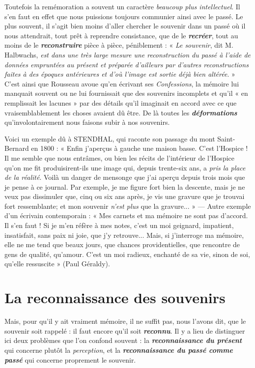 Toutefois la remémoration a souvent un caractère {\it beaucoup plus
intellectuel}. Il s’en faut en effet que nous puissions toujours communier
ainsi avec le passé. Le plus souvent, il s’agit bien moins d’aller
chercher le souvenir dans un passé où il nous attendrait, tout prêt
à reprendre consistance, que de le \textbf{\textit {recréer}}, tout au moins de le \textbf{\textit {reconstruire}}
pièce à pièce, péniblement : « {\it Le souvenir}, dit M. Halbwachs,
{\it est dans une très large mesure une reconstruction du passé à l’aide de
données empruntées au présent et préparée d’ailleurs par d’autres
reconstructions faites à des époques antérieures et d’où l’image est sortie
déjà bien altérée}. » C’est ainsi que Rousseau avoue qu’en écrivant ses
{\it Confessions}, la mémoire lui manquait souvent ou ne lui fournissait que
des souvenirs incomplets et qu’il « en remplissait les lacunes » par des
détails qu’il imaginait en accord avec ce que vraisemblablement les
choses avaient dû être. De là toutes les \textbf{\textit {déformations}} qu'involontairement
nous faisons subir à nos souvenirs.

\vspace{0.24cm}
{\footnotesize 
Voici un exemple dû à STENDHAL, qui raconte son passage du mont Saint-Bernard
en 1800 : « Enfin j’aperçus à gauche une maison basse. C'est
l’Hospice ! Il me semble que nous entrâmes, ou bien les récits de l’intérieur
de l’Hospice qu’on me fit produisirent-ils une image qui, depuis trente-six
ans, a {\it pris la place de la réalité}. Voilà un danger de mensonge que j'ai aperçu
depuis trois mois que je pense à ce journal. Par exemple, je me figure fort
bien la descente, mais je ne veux pas dissimuler que, cinq ou six ans après,
je vis une gravure que je trouvai fort ressemblante; et mon souvenir {\it n’est
plus} que la gravure... » — Autre exemple d’un écrivain contemporain :
« Mes carnets et ma mémoire ne sont pas d'accord. Il s’en faut ! Si je m’en
réfère à mes notes, c’est un moi geignard, impatient, insatisfait, sans paix
ni joie, que j'y retrouve... Mais, si j'interroge ma mémoire, elle ne me tend
que beaux jours, que chances providentielles, que rencontre de gens de
qualité, qu'amour. C’est un moi radieux, enchanté de sa vie, sinon de soi,
qu’elle ressuscite » (Paul Géraldy).}
\vspace{0.31cm}

\section{La reconnaissance des souvenirs}%
Mais, pour qu’il y
ait vraiment mémoire, il ne suffit pas, nous l’avons dit, que le souvenir
soit rappelé : il faut encore qu’il soit \textbf{\textit {reconnu}}. Il y a lieu de distinguer
ici deux problèmes que l’on confond souvent : la \textbf{\textit {reconnaissance du
présent}} qui concerne plutôt la {\it perception}, et la \textbf{\textit {reconnaissance du
passé comme passé}} qui concerne proprement le souvenir.

